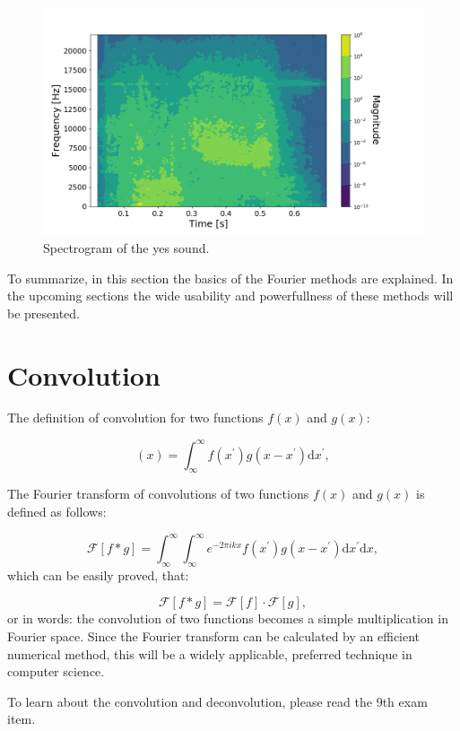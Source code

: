 \documentclass[12pt]{article}
\theoremstyle{plain}
\begin{document}
\begin{figure}[h!]
    \centering
	\includegraphics[width=.7\linewidth]{media/yes_sound_spectrogram.png}
	\caption{Spectrogram of the yes sound.}
	\label{spectrogram_2}
\end{figure}

To summarize, in this section the basics of the Fourier methods are explained. In the upcoming sections the wide usability and powerfullness of these methods will be presented.

\pagebreak
\section{Convolution}

The definition of convolution for two functions $f(x)$ and $g(x)$:

\begin{equation}
[f * g](x) = \int_{\infty}^{\infty} f(x^{\prime}) g( x - x^{\prime} ) \text{d}x^{\prime},
\end{equation}

The Fourier transform of convolutions of two functions $f(x)$ and $g(x)$ is defined as follows:

\begin{equation}
\mathcal{F}[f * g] = \int_{\infty}^{\infty} \int_{\infty}^{\infty} e^{-2\pi i k x} f(x^{\prime}) g( x - x^{\prime} ) \text{d}x^{\prime} \text{d}x,
\end{equation}
which can be easily proved, that:

\begin{equation}
\mathcal{F}[f * g] = \mathcal{F}[f] \cdot \mathcal{F}[g],
\end{equation}
or in words: the convolution of two functions becomes a simple multiplication in Fourier space. Since the Fourier transform can be calculated by an efficient numerical method, this will be a widely applicable, preferred technique in computer science.

To learn about the convolution and deconvolution, please read the 9th exam item.
\end{document}
